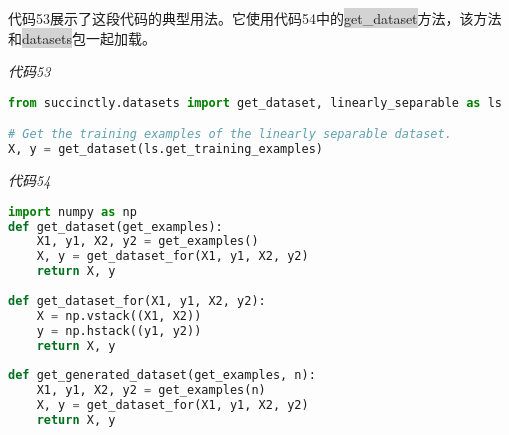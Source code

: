 代码53展示了这段代码的典型用法。它使用代码54中的\colorbox{lightgray}{get\_dataset}方法，该方法和\colorbox{lightgray}{datasets}包一起加载。

\emph{代码53}

\begin{lstlisting}[language=python]
from succinctly.datasets import get_dataset, linearly_separable as ls 

# Get the training examples of the linearly separable dataset. 
X, y = get_dataset(ls.get_training_examples)
\end{lstlisting}

\emph{代码54}

\begin{lstlisting}[language=python]
import numpy as np 
def get_dataset(get_examples): 
    X1, y1, X2, y2 = get_examples() 
    X, y = get_dataset_for(X1, y1, X2, y2) 
    return X, y 
    
def get_dataset_for(X1, y1, X2, y2): 
    X = np.vstack((X1, X2)) 
    y = np.hstack((y1, y2)) 
    return X, y 
    
def get_generated_dataset(get_examples, n): 
    X1, y1, X2, y2 = get_examples(n) 
    X, y = get_dataset_for(X1, y1, X2, y2) 
    return X, y
\end{lstlisting}
